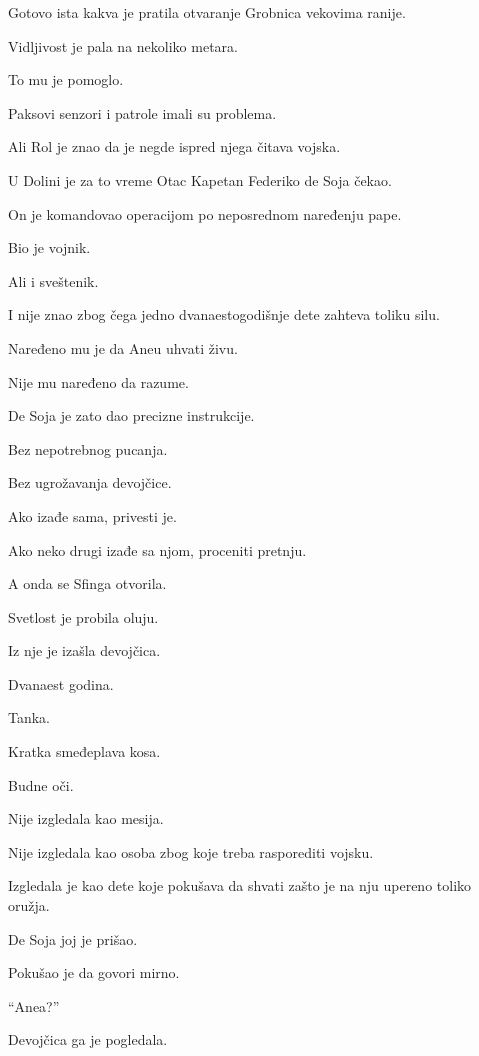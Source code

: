 Gotovo ista kakva je pratila otvaranje Grobnica vekovima ranije.

Vidljivost je pala na nekoliko metara.

To mu je pomoglo.

Paksovi senzori i patrole imali su problema.

Ali Rol je znao da je negde ispred njega čitava vojska.

\bigskip

U Dolini je za to vreme Otac Kapetan Federiko de Soja čekao.

On je komandovao operacijom po neposrednom naređenju pape.

Bio je vojnik.

Ali i sveštenik.

I nije znao zbog čega jedno dvanaestogodišnje dete zahteva toliku silu.

Naređeno mu je da Aneu uhvati živu.

Nije mu naređeno da razume.

\bigskip

De Soja je zato dao precizne instrukcije.

Bez nepotrebnog pucanja.

Bez ugrožavanja devojčice.

Ako izađe sama, privesti je.

Ako neko drugi izađe sa njom, proceniti pretnju.

\bigskip

A onda se Sfinga otvorila.

\bigskip

Svetlost je probila oluju.

Iz nje je izašla devojčica.

Dvanaest godina.

Tanka.

Kratka smeđeplava kosa.

Budne oči.

Nije izgledala kao mesija.

Nije izgledala kao osoba zbog koje treba rasporediti vojsku.

Izgledala je kao dete koje pokušava da shvati zašto je na nju upereno toliko oružja.

\bigskip

De Soja joj je prišao.

Pokušao je da govori mirno.

``Anea?''

Devojčica ga je pogledala.

